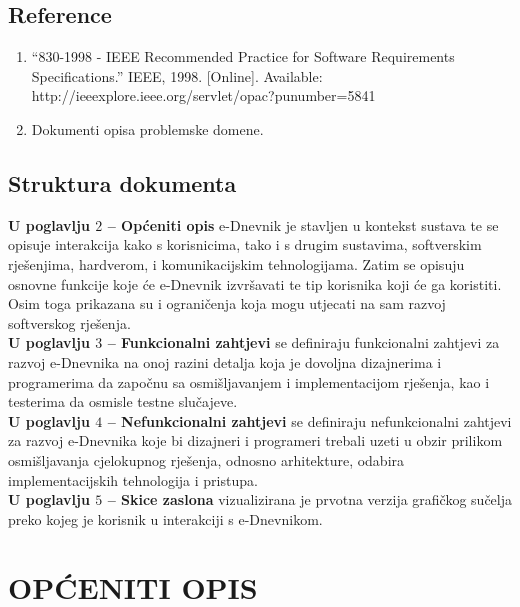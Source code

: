\documentclass{scrreprt}
\begin{document}
\section{Reference}
\begin{enumerate}
    \item “830-1998 - IEEE Recommended Practice for Software Requirements Specifications.” IEEE, 1998. [Online]. Available: http://ieeexplore.ieee.org/servlet/opac?punumber=5841
    \item Dokumenti opisa problemske domene.
\end{enumerate}

\section{Struktura dokumenta}
\textbf{U poglavlju $2$ – Općeniti opis} e-Dnevnik je stavljen u kontekst sustava te se opisuje interakcija kako s korisnicima, tako i s drugim sustavima, softverskim rješenjima, hardverom, i komunikacijskim tehnologijama. Zatim se opisuju osnovne funkcije koje će e-Dnevnik izvršavati te tip korisnika koji će ga koristiti. Osim toga prikazana su i ograničenja koja mogu utjecati na sam razvoj softverskog rješenja.\\
\textbf{U poglavlju $3$ – Funkcionalni zahtjevi} se definiraju funkcionalni zahtjevi za razvoj e-Dnevnika na onoj razini detalja koja je dovoljna dizajnerima i programerima da započnu sa osmišljavanjem i implementacijom rješenja, kao i testerima da osmisle testne slučajeve.\\
\textbf{U poglavlju $4$ – Nefunkcionalni zahtjevi} se definiraju nefunkcionalni zahtjevi za razvoj e-Dnevnika koje bi dizajneri i programeri trebali uzeti u obzir prilikom osmišljavanja cjelokupnog rješenja, odnosno arhitekture, odabira implementacijskih tehnologija i pristupa.\\
\textbf{U poglavlju $5$ – Skice zaslona} vizualizirana je prvotna verzija grafičkog sučelja preko kojeg je korisnik u interakciji s e-Dnevnikom.

\chapter{OPĆENITI OPIS}
\end{document}
